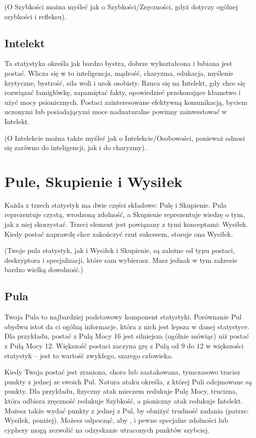 (O Szybkości można myśleć jak o Szybkości/Zręczności, gdyż dotyczy ogólnej szybkości i refleksu).

\subsection{Intelekt}

Ta statystyka określa jak bardzo bystra, dobrze wykształcona i lubiana jest postać. Wlicza się w to inteligencja, mądrość, charyzma, edukacja, myślenie krytyczne, bystrość, siła woli i urok osobisty. Rzuca się na Intelekt, gdy chce się rozwiązać łamigłówkę, zapamiętać fakty, opowiedzieć przekonujące kłamstwo i użyć mocy psionicznych. Postaci zainteresowane efektywną komunikacją, byciem uczonymi lub posiadającymi moce nadnaturalne powinny zainwestować w Intelekt.

(O Intelekcie można także myśleć jak o Intelekcie/Osobowości, ponieważ odnosi się zarówno do inteligencji, jak i do charyzmy).

\section{Pule, Skupienie i Wysiłek}

Każda z trzech statystyk ma dwie części składowe: Pulę i Skupienie. Pula reprezentuje czystą, wrodzoną zdolność, a Skupienie reprezentuje wiedzę o tym, jak z niej skorzystać. Trzeci element jest powiązany z tymi konceptami: Wysiłek. Kiedy postać naprawdę chce zakończyć rzut sukcesem, stosuje ona Wysiłek.

(Twoje pula statystyk, jak i Wysiłek i Skupienie, są zależne od typu postaci, deskryptora i specjalizacji, które sam wybierasz. Masz jednak w tym zakresie bardzo wielką dowolność.)


\subsection{Pula}

Twoja Pula to najbardziej podstawowy komponent statystyki. Porównanie Pul obydwu istot da ci ogólną informacje, która z nich jest lepsza w danej statystyce. Dla przykładu, postać z Pulą Mocy 16 jest silniejsza (ogólnie mówiąc) niż postać z Pulą Mocy 12. Większość postaci zaczyna grę z Pulą od 9 do 12 w większości statystyk – jest to wartość zwykłego, szarego człowieka. 

Kiedy Twoja postać jest zraniona, chora lub zaatakowana, tymczasowo tracisz punkty z jednej ze swoich Pul. Natura ataku określa, z której Puli odejmowane są punkty. Dla przykładu, fizyczny atak mieczem redukuje Pulę Mocy, trucizna, która odbiera zręczność redukuje Szybkość, a pioniczny atak redukuje Intelekt. Możesz także wydać punkty z jednej z Pul, by obniżyć trudność zadania (patrze: Wysiłek, poniżej). Możesz odpocząć, aby , i  pewne specjalne zdolności lub cyphery mogą zezwolić na odzyskanie utraconych punktów szybciej.


